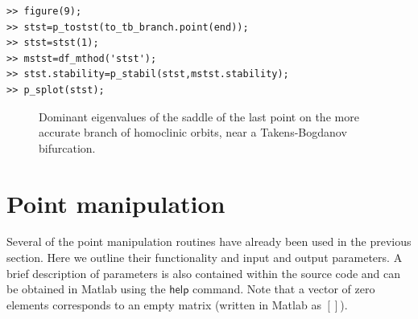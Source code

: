 \documentclass[10pt]{article}
\gdef \parm#1{{\mathsf{#1}}}
\begin{document}
{{\begin{verbatim}
>> figure(9);
>> stst=p_tostst(to_tb_branch.point(end));
>> stst=stst(1);
>> mstst=df_mthod('stst');
>> stst.stability=p_stabil(stst,mstst.stability);
>> p_splot(stst);
\end{verbatim}
}

\begin{figure}
\begin{center}
\caption{\small Dominant eigenvalues of the saddle of the last point on the 
more accurate branch
of homoclinic orbits,
near a Takens-Bogdanov bifurcation.\label{demo3-9}}
\end{center}
\end{figure}

\section{Point manipulation}\label{point_manipulation}

Several of the point manipulation routines have already been used
in the previous section.
Here we outline their functionality and input and output parameters.
A brief description of parameters is also contained
within the source code and can be obtained in Matlab using the
$\parm{help}$ command. Note that a vector of zero elements 
corresponds to an empty matrix
(written in Matlab as $[]$).

}
\end{document}
